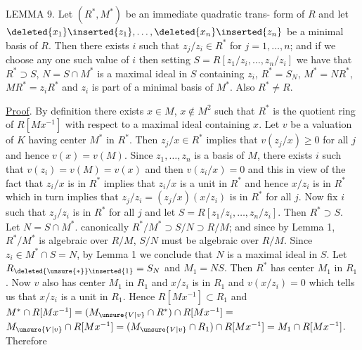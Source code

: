 LEMMA 9. Let $(R^*,M^*)$ be an immediate quadratic trans-
form of $R$ and let $\deleted{x_1}\inserted{z_1},\ldots,\deleted{x_n}\inserted{z_n}$ be a minimal basis of
$R$. Then there exists $i$ such that $z_j/z_i\in R^*$ for
$j=1,\ldots,n$; and if we choose any one such value of
$i$ then setting $S=R[z_1/z_i,\ldots,z_n/z_i]$ we have that
$R^*\supset S$, $N=S\cap M^*$ is a maximal ideal in $S$ containing
$z_i$, $R^*=S_N$, $M^*=NR^*$, $MR^*=z_iR^*$ and $z_i$ is part of
a minimal basis of $M^*$. Also $R^*\ne R$.

\uline{Proof}. By definition there exists $x\in M$, $x\notin M^2$ such that
$R^*$ is the quotient ring of $R[Mx^{-1}]$ with respect to a maximal
ideal containing $x$. Let $v$ be a valuation of $K$ having center
$M^*$ in $R^*$. Then $z_j/x\in R^*$ implies that $v(z_j/x)\ge0$ for all
$j$ and hence $v(x)=v(M)$. Since $z_1,\ldots,z_n$ is a basis of $M$,
there exists $i$ such that $v(z_i)=v(M)=v(x)$ and then
$v(z_i/x)=0$ and this in view of the fact that $z_i/x$ is in $R^*$
implies that $z_i/x$ is a unit in $R^*$ and hence $x/z_i$ is in $R^*$
which in turn implies that $z_j/z_i=(z_j/x)(x/z_i)$ is in $R^*$ for
all $j$. Now fix $i$ such that $z_j/z_i$ is in $R^*$ for all $j$ and
let $S=R[z_1/z_i,\ldots,z_n/z_i]$. Then $R^*\supset S$. Let $N=S\cap M^*$.
 canonically $R^*/M^*\supset S/N\supset R/M$; and since by Lemma 1, $R^*/M^*$
is algebraic over $R/M$, $S/N$ must be algebraic over $R/M$. Since
$z_i\in M^*\cap S=N$, by Lemma 1 we conclude that $N$ is a maximal
ideal in $S$. Let $R_{\deleted{\unsure{*}}\inserted{1}}=S_N$ and $M_1=NS$. Then $R^*$ has center
$M_1$ in $R_1$. Now $v$ also has center $M_1$ in $R_1$ and $x/z_i$ is
in $R_1$ and $v(x/z_i)=0$ which tells us that $x/z_i$ is a unit in
$R_1$. Hence $R[Mx^{-1}]\subset R_1$ and $M^*\cap R[Mx^{-1}]=(M_{\unsure{V|v}}\cap R^*)\cap R[Mx^{-1}]=$
$M_{\unsure{V|v}}\cap R[Mx^{-1}]=(M_{\unsure{V|v}}\cap R_1)\cap R[Mx^{-1}]=M_1\cap R[Mx^{-1}]$. Therefore

